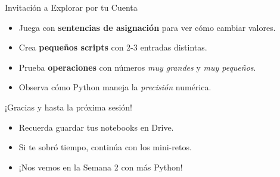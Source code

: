 \documentclass[10pt]{beamer}
\begin{document}
\begin{frame}{Invitación a Explorar por tu Cuenta}
  \begin{itemize}
    \item Juega con \textbf{sentencias de asignación} para ver cómo cambiar valores.
    \item Crea \textbf{pequeños scripts} con 2-3 entradas distintas.
    \item Prueba \textbf{operaciones} con números \emph{muy grandes} y \emph{muy pequeños}.
    \item Observa cómo Python maneja la \textit{precisión} numérica.
  \end{itemize}
\end{frame}

\begin{frame}
  \huge{\centerline{¡Gracias y hasta la próxima sesión!}}
  \vspace{0.4cm}
  \normalsize
  \begin{itemize}
    \item Recuerda guardar tus notebooks en Drive.
    \item Si te sobró tiempo, continúa con los mini-retos.
    \item ¡Nos vemos en la Semana 2 con más Python!
  \end{itemize}
\end{frame}
\end{document}
